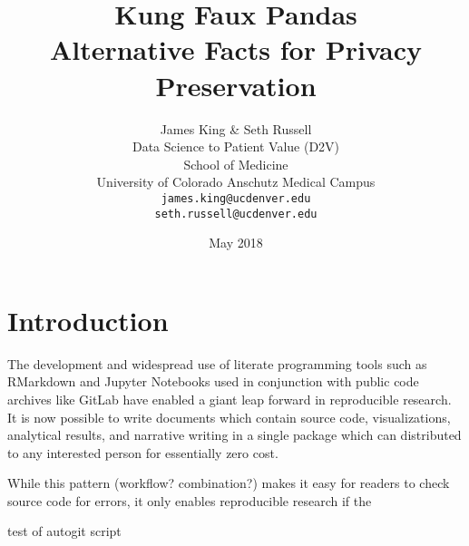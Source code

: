 \documentclass{article}
\title{%
  Kung Faux Pandas \\
  \large Alternative Facts for 
    Privacy Preservation}
\author{
  James King \& Seth Russell\\
  Data Science to Patient Value (D2V) \\
  School of Medicine \\
  University of Colorado Anschutz Medical Campus\\
  \texttt{james.king@ucdenver.edu} \\ 
  \texttt{seth.russell@ucdenver.edu} \\
  }
\date{May 2018}
\begin{document}


\maketitle

\begin{abstract}

\end{abstract}

\section{Introduction}

The development and widespread use of literate programming tools such as RMarkdown and Jupyter Notebooks used in conjunction with public code archives like GitLab have enabled a giant leap forward in reproducible research.  It is now possible to write documents which contain source code, visualizations, analytical results, and narrative writing in a single package which can distributed to any interested person for essentially zero cost.

While this pattern (workflow? combination?) makes it easy for readers to check source code for errors, it only enables reproducible research if the 

test of autogit script



\end{document}
